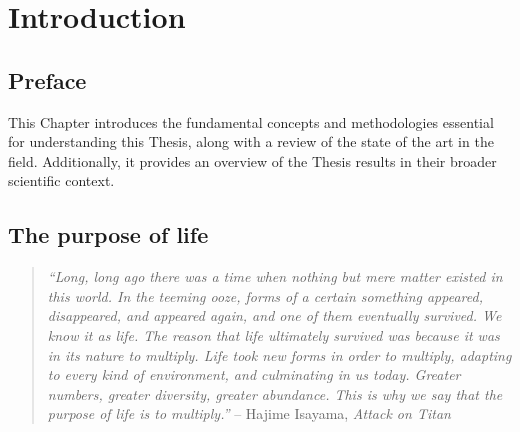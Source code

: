 \chapter{Introduction}

\section*{Preface}


This Chapter introduces the fundamental concepts and methodologies essential for understanding this Thesis, along with a review of the state of the art in the field. Additionally, it provides an overview of the Thesis results in their broader scientific context.

\section*{The purpose of life}


\begin{quote}
\textit{``Long, long ago there was a time when nothing but mere matter existed in this world. In the teeming ooze, forms of a certain something appeared, disappeared, and appeared again, and one of them eventually survived. We know it as life. The reason that life ultimately survived was because it was in its nature to multiply. Life took new forms in order to multiply, adapting to every kind of environment, and culminating in us today. Greater numbers, greater diversity, greater abundance. This is why we say that the purpose of life is to multiply.''} -- Hajime Isayama, \textit{Attack on Titan}  \cite{ISAYAMA_2021}
\end{quote}

